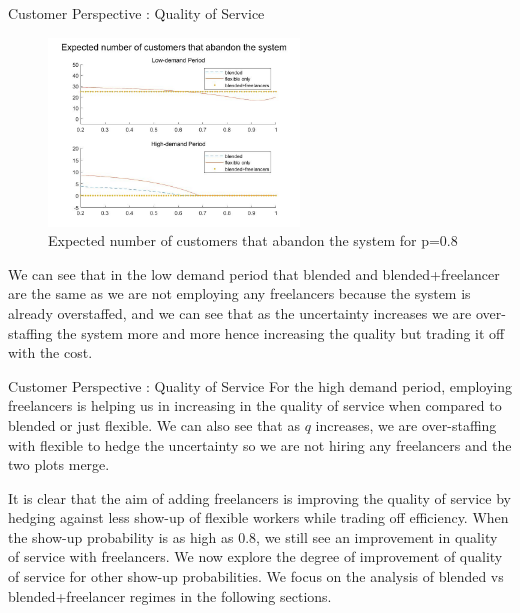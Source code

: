 \documentclass[8pt]{beamer}
\begin{document}
\begin{frame}{Customer Perspective : Quality of Service}
\begin{figure}[hbt!]
\includegraphics[height=5cm]{abandon.jpg}
\caption{Expected number of customers that abandon the system for p=0.8}
\end{figure}
We can see that in the low demand period that blended and blended+freelancer are the same as we are not employing any freelancers because the system is already overstaffed, and we can see that as the uncertainty increases we are over-staffing the system more and more hence increasing the quality but trading it off with the cost. 

\end{frame}
\begin{frame}{Customer Perspective : Quality of Service}
For the high demand period, employing freelancers is helping us in increasing in the quality of service when compared to  blended or just flexible. We can also see that as $q$ increases, we are over-staffing with flexible to hedge the uncertainty so we are not hiring any freelancers and the two plots merge. \bigskip

It is clear that the aim of adding freelancers is improving the quality of service by hedging against less show-up of flexible workers while trading off efficiency. When the show-up probability is as high as 0.8, we still see an improvement in quality of service with freelancers. We now explore the degree of improvement of quality of service for other show-up probabilities. We focus on the analysis of blended vs blended+freelancer regimes in the following sections.
\end{frame}
\end{document}
